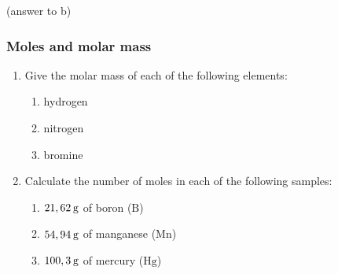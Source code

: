 {\begin{mdframed}[linewidth=4, leftmargin=40, rightmargin=40]
\begin{exercise}
\begin{enumerate}[noitemsep, label=\textbf{Step} \textbf{\arabic*}. ]
      
      \label{m38717*id277263}(answer to b)\par 
\end{enumerate}
         

    \end{exercise}
    \end{mdframed}
    }
    \noindent
  
\label{m38717*secfhsst!!!underscore!!!id305}
            \subsubsection{  Moles and molar mass
      }
            \nopagebreak
            
      \label{m38717*id277281}\begin{enumerate}[noitemsep, label=\textbf{\arabic*}. ] 
            \label{m38717*uid14}\item Give the molar mass of each of the following elements:
\label{m38717*id277295}\begin{enumerate}[noitemsep, label=\textbf{\alph*}. ] 
            \label{m38717*uid15}\item hydrogen
\label{m38717*uid16}\item nitrogen
\label{m38717*uid17}\item bromine
\end{enumerate}
                \label{m38717*uid18}\item Calculate the number of moles in each of the following samples:
\label{m38717*id277346}\begin{enumerate}[noitemsep, label=\textbf{\alph*}. ] 
            \label{m38717*uid19}\item \begin{math}21,62\phantom{\rule{2pt}{0ex}}\mathrm{g}\end{math} of boron (\begin{math}\mathrm{B}\end{math})
\label{m38717*uid20}\item \begin{math}54,94\phantom{\rule{2pt}{0ex}}\mathrm{g}\end{math} of manganese (\begin{math}\mathrm{Mn}\end{math})
\label{m38717*uid21}\item \begin{math}100,3\phantom{\rule{2pt}{0ex}}\mathrm{g}\end{math} of mercury (\begin{math}\mathrm{Hg}\end{math})

\end{enumerate}
\end{enumerate}
